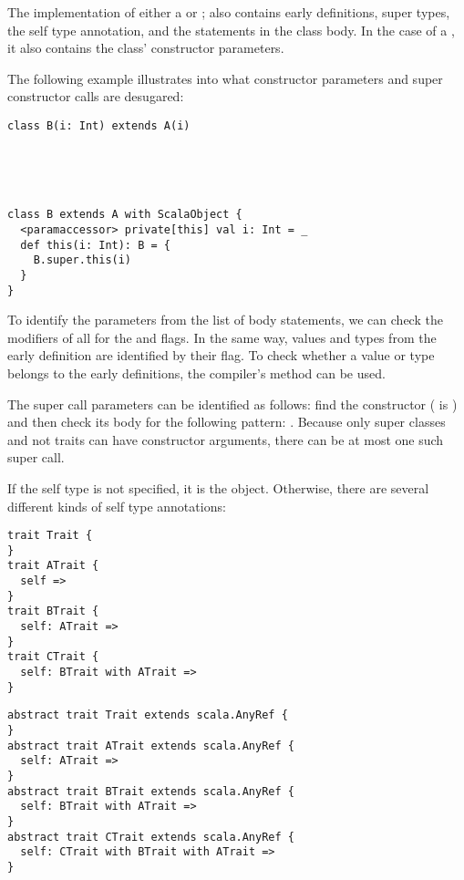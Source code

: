 \noindent The implementation of either a  or ; also contains early definitions, super types, the self type annotation, and the statements in the class body. In the case of a , it also contains the class' constructor parameters.

The following example illustrates into what constructor parameters and super constructor calls are desugared:

\begin{multicols}{2}
\begin{lstlisting}
class B(i: Int) extends A(i)





\end{lstlisting}

\begin{lstlisting}
class B extends A with ScalaObject {
  <paramaccessor> private[this] val i: Int = _
  def this(i: Int): B = {
    B.super.this(i)
  }
}
\end{lstlisting}
\end{multicols}

To identify the parameters from the list of body statements, we can check the modifiers of all  for the  and  flags. In the same way, values and types from the early definition are identified by their  flag. To check whether a value or type belongs to the early definitions, the compiler's  method can be used.

The super call parameters can be identified as follows: find the constructor  ( is ) and then check its body  for the following pattern: . Because only super classes and not traits can have constructor arguments, there can be at most one such super call.

If the self type is not specified, it is the  object. Otherwise, there are several different kinds of self type annotations:

\begin{multicols}{2}
\begin{lstlisting}
trait Trait {
}
trait ATrait {
  self =>
}
trait BTrait {
  self: ATrait =>
}
trait CTrait {
  self: BTrait with ATrait =>
}
\end{lstlisting}
\begin{lstlisting}
abstract trait Trait extends scala.AnyRef {
}
abstract trait ATrait extends scala.AnyRef { 
  self: ATrait => 
}
abstract trait BTrait extends scala.AnyRef {
  self: BTrait with ATrait =>
}
abstract trait CTrait extends scala.AnyRef {
  self: CTrait with BTrait with ATrait =>
}
\end{lstlisting}
\end{multicols}


